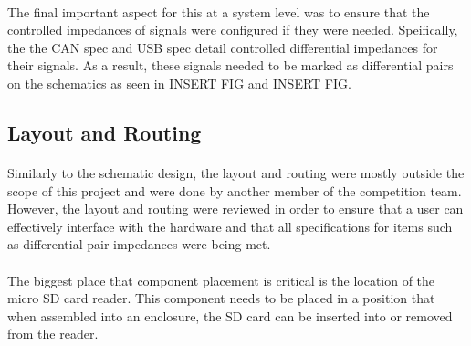 \paragraph{}
The final important aspect for this at a system level was to ensure that the controlled impedances of signals were configured if they were needed.
Speifically, the the CAN spec and USB spec detail controlled differential impedances for their signals.
As a result, these signals needed to be marked as differential pairs on the schematics as seen in INSERT FIG and INSERT FIG.

\subsection{Layout and Routing}

\paragraph{}
Similarly to the schematic design, the layout and routing were mostly outside the scope of this project and were done by another member of the competition team.
However, the layout and routing were reviewed in order to ensure that a user can effectively interface with the hardware and that all specifications for items such as differential pair impedances were being met.

\paragraph{}
The biggest place that component placement is critical is the location of the micro SD card reader.
This component needs to be placed in a position that when assembled into an enclosure, the SD card can be inserted into or removed from the reader.